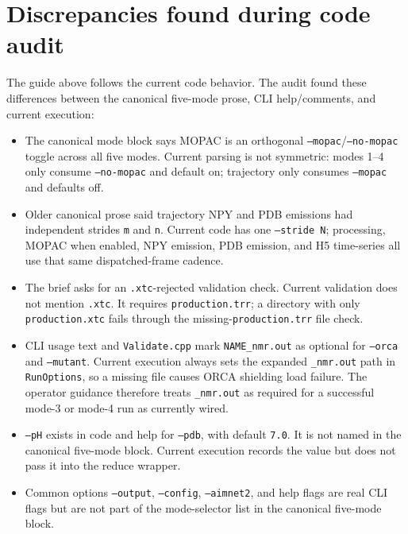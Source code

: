 \documentclass[11pt]{article}
\begin{document}
\section{Discrepancies found during code audit}

The guide above follows the current code behavior. The audit found these
differences between the canonical five-mode prose, CLI help/comments, and
current execution:

\begin{itemize}
\item The canonical mode block says MOPAC is an orthogonal
  \texttt{--mopac}/\texttt{--no-mopac} toggle across all five modes. Current
  parsing is not symmetric: modes 1--4 only consume \texttt{--no-mopac} and
  default on; trajectory only consumes \texttt{--mopac} and defaults off.
\item Older canonical prose said trajectory NPY and PDB emissions had
  independent strides \texttt{m} and \texttt{n}. Current code has one
  \texttt{--stride N}; processing, MOPAC when enabled, NPY emission, PDB
  emission, and H5 time-series all use that same dispatched-frame cadence.
\item The brief asks for an \texttt{.xtc}-rejected validation check. Current
  validation does not mention \texttt{.xtc}. It requires
  \texttt{production.trr}; a directory with only \texttt{production.xtc} fails
  through the missing-\texttt{production.trr} file check.
\item CLI usage text and \texttt{Validate.cpp} mark \texttt{NAME\_nmr.out} as
  optional for \texttt{--orca} and \texttt{--mutant}. Current execution always
  sets the expanded \texttt{\_nmr.out} path in \texttt{RunOptions}, so a
  missing file causes ORCA shielding load failure. The operator guidance
  therefore treats \texttt{\_nmr.out} as required for a successful mode-3 or
  mode-4 run as currently wired.
\item \texttt{--pH} exists in code and help for \texttt{--pdb}, with default
  \texttt{7.0}. It is not named in the canonical five-mode block. Current
  execution records the value but does not pass it into the reduce wrapper.
\item Common options \texttt{--output}, \texttt{--config}, \texttt{--aimnet2},
  and help flags are real CLI flags but are not part of the mode-selector list
  in the canonical five-mode block.
\end{itemize}
\end{document}
